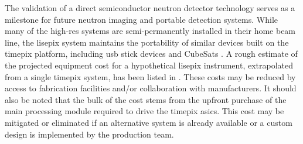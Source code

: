 \documentclass[../../../main.tex]{subfiles}%
\begin{document}
%
    \Xsubsection%
    The validation of a direct semiconductor neutron detector technology serves as a milestone for future neutron imaging and portable detection systems.
    While many of the \gls{high-res} systems are semi-permanently installed in their home beam line, the \gls{lisepix} system maintains the portability of similar devices built on the \gls{timepix} platform, including \gls{usb} stick devices and CubeSats \cite{Turecek_2011, Baca_2016, Egner_2016}.
    A rough estimate of the projected equipment cost for a hypothetical \Xmath{4\times} \gls{lisepix} instrument, extrapolated from a single \gls{timepix} system, has been listed in .
    These costs may be reduced by access to fabrication facilities and/or collaboration with manufacturers.
    It should also be noted that the bulk of the cost stems from the upfront purchase of the main processing module required to drive the \gls{timepix} \glspl{asic}.
    This cost may be mitigated or eliminated if an alternative system is already available or a custom design is implemented by the production team.
\end{document}
